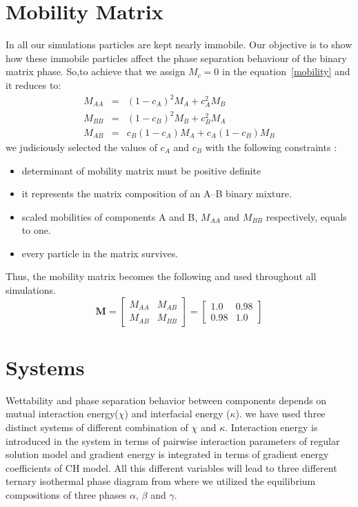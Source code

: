 \documentclass[12pt]{iiscthes}
\theoremstyle{definition}
\theoremstyle{definition}
\theoremstyle{remark}
\begin{document}
\section{Mobility Matrix}\label{mm}
In all our simulations particles are kept nearly immobile. Our objective is to show how these immobile particles affect the phase separation behaviour of the binary matrix phase. So,to achieve that we assign $M_c = 0$ in the equation~\ref{mobility} and it reduces to:
\begin{eqnarray}
M_{AA} &=& (1 - c_A)^2 M_A + c_A^2 M_B\nonumber\\
M_{BB} &=& (1 - c_B)^2 M_B + c_B^2 M_A\nonumber\\
M_{AB} &=& c_B (1 - c_A) M_A + c_A (1 - c_B) M_B
\end{eqnarray}
we judiciously selected the values of $c_A$ and $c_B$ with the following constraints : 
\begin{itemize}
\item determinant of mobility matrix must be positive definite 
\item it represents the matrix composition of an A--B binary mixture.
\item scaled mobilities of components A and B, $M_{AA}$ and $M_{BB}$ respectively, equals to one.  
\item every particle in the matrix survives.
\end{itemize}
Thus, the mobility matrix becomes the following and used throughout all simulations.
\begin{equation}
\textbf{M} =
\left[
\begin{array}{cc}
M_{AA}&M_{AB}\\
M_{AB}&M_{BB}
\end{array}
\right]
=
\left[
\begin{array}{cc}
1.0&0.98\\
0.98&1.0
\end{array}
\right]
\end{equation}
\section{Systems}
Wettability and phase separation behavior between components depends on mutual interaction  energy($\chi$) and interfacial energy ($\kappa$). we have used three distinct systems of different combination of $\chi$ and $\kappa$. Interaction energy is introduced in the system in terms of pairwise interaction parameters of regular solution model and gradient energy is integrated in terms of gradient energy coefficients of CH model. All this different variables will lead to three different ternary isothermal phase diagram from where we utilized the equilibrium compositions of three phases $\alpha$, $\beta$ and $\gamma$.
\end{document}
